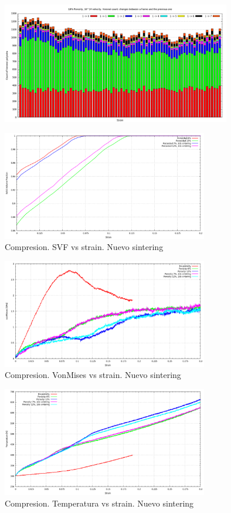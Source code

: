 \documentclass[10pt, oneside]{article} %
\begin{document}
\begin{figure}[H]
\centering
\includegraphics[width=10cm]{Figures/Porosidad/Porosidad_2vel_trac_voronoi_hist4.png}
\caption{}
\end{figure}

\begin{figure}[H]
\centering
\includegraphics[width=9cm]{Figures/Porosidad/Porosidad_newSinter_svf.png}
\caption{Compresion. SVF vs strain. Nuevo sintering}
\end{figure}

\begin{figure}[H]
\centering
\includegraphics[width=9cm]{Figures/Porosidad/Porosidad_newSinter_vm.png}
\caption{Compresion. VonMises vs strain. Nuevo sintering}
\end{figure}

\begin{figure}[H]
\centering
\includegraphics[width=9cm]{Figures/Porosidad/Porosidad_newSinter_temp.png}
\caption{Compresion. Temperatura vs strain. Nuevo sintering}
\end{figure}
\end{document}

